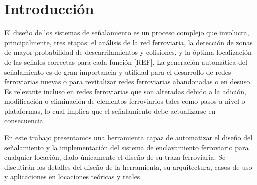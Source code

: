 \chapter{Introducción}

    El diseño de los sistemas de señalamiento es un proceso complejo que involucra, principalmente, tres etapas: el análisis de la red ferroviaria, la detección de zonas de mayor probabilidad de descarrilamientos y colisiones, y la óptima localización de las señales correctas para cada función [REF]. La generación automática del señalamiento es de gran importancia y utilidad para el desarrollo de redes ferroviarias nuevas o para revitalizar redes ferroviarias abandonadas o en desuso. Es relevante incluso en redes ferroviarias que son alteradas debido a la adición, modificación o eliminación de elementos ferroviarios tales como pasos a nivel o plataformas, lo cual implica que el señalamiento debe actualizarse en consecuencia.
    
    En este trabajo presentamos una herramienta capaz de automatizar el diseño del señalamiento y la implementación del sistema de enclavamiento ferroviario para cualquier locación, dado únicamente el diseño de su traza ferroviaria. Se discutirán los detalles del diseño de la herramienta, su arquitectura, casos de uso y aplicaciones en locaciones teóricas y reales.







